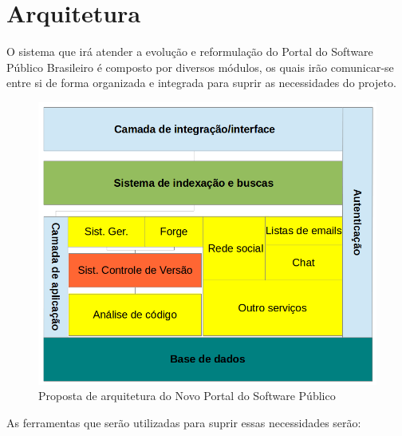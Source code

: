 \section{Arquitetura}
\label{sec:arquitetura}

O sistema que irá atender a evolução e reformulação do Portal do Software Público Brasileiro é composto por diversos módulos, os quais irão comunicar-se entre si de forma organizada e integrada para suprir as necessidades do projeto.
%

\begin{figure}[htpb]
  \begin{center}
    \includegraphics[width=.37\textwidth]{images/visao_arq.png}
  \end{center}
  \caption{Proposta de arquitetura do Novo Portal do Software Público}
  \label{fig:core_concurrent}
\end{figure}

As ferramentas que serão utilizadas para suprir essas necessidades serão:

